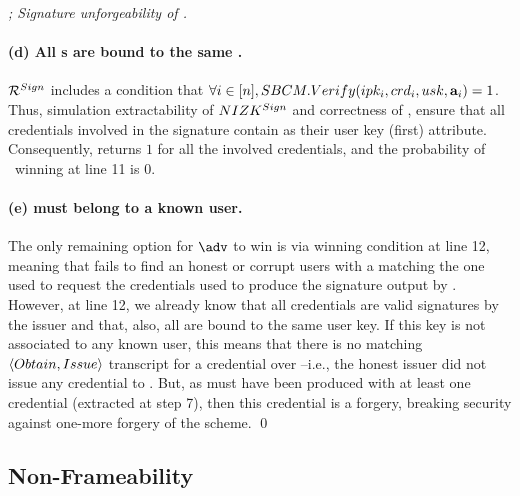 \begin{proof}[; Signature unforgeability of \CUASGen]
  \paragraph{(d) All {\cred}s are bound to the same \usk.} %
  $\mathcal{R}^{Sign}$ includes a condition that $\forall i\in[n],
  SBCM.Verify(ipk_i,crd_i,usk,\mathbf{a}_i) = 1$. Thus, simulation
  extractability of $NIZK^{Sign}$ and correctness of \SBCM, ensure that all
  credentials involved in the signature contain \usk as their user key (first)
  attribute. Consequently, \IdentifyCred returns $1$ for all the involved
  credentials, and the probability of \adv~winning at line 11 is $0$.

  \paragraph{(e) \usk must belong to a known user.} %
  The only remaining option for $\adv$ to win is via winning condition at line
  12, meaning that \IdentifySig fails to find an honest or corrupt users with
  a \usk matching the one used to request the credentials used to produce the
  signature output by \adv. However, at line 12, we already know that all
  credentials are valid signatures by the issuer and that, also, all are bound
  to the same user key. If this key is not associated to any known user, this
  means that there is no matching $\langle Obtain,Issue\rangle$ transcript for
  a credential over \usk --i.e., the honest issuer did not issue any credential
  to \usk. But, as \sig must have been produced with at least one credential
  (extracted at step 7), then this credential is a forgery, breaking security
  against one-more forgery of the \SBCM scheme.
  \qed
\end{proof}

\subsection{Non-Frameability}

